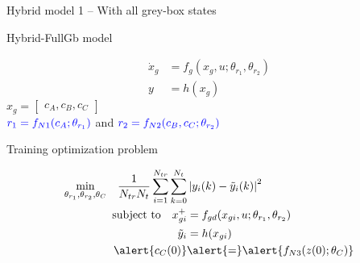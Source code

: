 \documentclass[xcolor=dvipsnames, 8pt]{beamer} %
\begin{document}
\begin{frame}{Hybrid model 1 -- With all grey-box states}

\begin{block}{Hybrid-FullGb model}

	\begin{align*}
		\dot{x}_{g} &= f_g(x_g, u;\theta_{r_1}, \theta_{r_2}) \\ 
		y &= h(x_g)
	\end{align*}
	$x_g = \begin{bmatrix} c_A, c_B, c_C\end{bmatrix}$ \\
	$\textcolor{blue}{r_1 = f_{N1}(c_A;\theta_{r_1})}$ and 
	$\textcolor{blue}{r_2 = f_{N2}(c_B, c_C;\theta_{r_2})}$
\end{block}

\pause
\begin{block}{Training optimization problem}
	
	\begin{align*}
		\underset{\theta_{r_1}, 
				  \theta_{r_2}, \theta_{C}}{\textnormal{min}} \quad 
		\dfrac{1}{N_{tr} 
			N_t} \sum_{i=1}^{N_{tr}}
		\sum_{k=0}^{N_t} & \norm{y_i(k) - \tilde{y}_i(k)}^2 \\ 
		\textnormal{subject to} \quad x_{gi}^+ & = f_{gd}(x_{gi}, 
		u;\theta_{r_1}, 
		\theta_{r_2}) \\
		\tilde{y}_i &= h(x_{gi}) \\ 
		\alert{c_C(0)} & \alert{=} \alert{f_{N3}(z(0); \theta_C)}\\ 
	\end{align*}
\end{block}

\end{frame}
\end{document}
